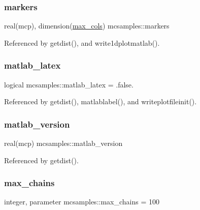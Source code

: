 \subsubsection{\texorpdfstring{markers}{markers}}
{\footnotesize\ttfamily real(mcp), dimension(\mbox{\hyperlink{namespacemcsamples_ae8386bad918d8af8d203683c01d5818c}{max\+\_\+cols}}) mcsamples\+::markers}



Referenced by getdist(), and write1dplotmatlab().

\mbox{\label{namespacemcsamples_acd85fa3b4250ca366e08576bd4df6bd8}} 
\subsubsection{\texorpdfstring{matlab\+\_\+latex}{matlab\_latex}}
{\footnotesize\ttfamily logical mcsamples\+::matlab\+\_\+latex = .false.}



Referenced by getdist(), matlablabel(), and writeplotfileinit().

\mbox{\label{namespacemcsamples_a24dc02cd209419956007efc05c309274}} 
\subsubsection{\texorpdfstring{matlab\+\_\+version}{matlab\_version}}
{\footnotesize\ttfamily real(mcp) mcsamples\+::matlab\+\_\+version}



Referenced by getdist().

\mbox{\label{namespacemcsamples_a204c829ca43df2c6d41335156e6786ee}} 
\subsubsection{\texorpdfstring{max\+\_\+chains}{max\_chains}}
{\footnotesize\ttfamily integer, parameter mcsamples\+::max\+\_\+chains = 100}



